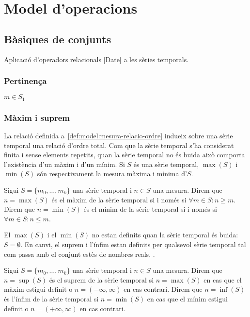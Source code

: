 \section{Model d'operacions}








\subsection{Bàsiques de conjunts}

Aplicació d'operadors relacionals [Date] a les sèries temporals.


\subsubsection{Pertinença}


$ m \in S_1$


\subsubsection{Màxim i suprem}

La relació definida a~\ref{def:model:mesura-relacio-ordre} indueix
sobre una sèrie temporal una relació d'ordre total. Com que la sèrie
temporal s'ha considerat finita i sense elements repetits, quan la
sèrie temporal no és buida això comporta l'existència d'un màxim i
d'un mínim.  Si $S$ és una sèrie temporal, $\max(S)$ i $\min(S)$ són
respectivament la mesura màxima i mínima d'$S$.

\begin{definition}
  Sigui $S=\{m_0,\ldots,m_k\}$ una sèrie temporal i $n\in S$ una
  mesura.  Direm que $n=\max(S)$ és el màxim de la sèrie temporal si i
  només si $\forall m \in S: n \geq m $.  Direm que $n=\min(S)$ és el
  mínim de la sèrie temporal si i només si $\forall m \in S: n \leq
  m$.
\end{definition}

El $\max(S)$ i el $\min(S)$ no estan definits quan la sèrie temporal
és buida: $S= \emptyset$. En
canvi, el suprem i l'ínfim estan definits per qualsevol
sèrie temporal tal com passa amb el conjunt estès de nombres reals,
\cite{cantrell:extendedreal}.  

\begin{definition}
  Sigui $S=\{m_0,\ldots,m_k\}$ una sèrie temporal i $n\in S$ una
  mesura.  Direm que $n=\sup(S)$ és el suprem de la sèrie temporal si
  $n=\max(S)$ en cas que el màxim estigui definit o
  $n=(-\infty,\infty)$ en cas contrari.  Direm que $n=\inf(S)$ és
  l'ínfim de la sèrie temporal si $n=\min(S)$ en cas que el mínim
  estigui definit o $n=(+\infty,\infty)$ en cas contrari.
\end{definition}

